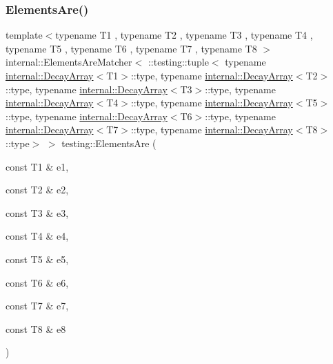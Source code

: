 \subsubsection{\texorpdfstring{ElementsAre()}{ElementsAre()}\hspace{0.1cm}{\footnotesize\ttfamily [9/11]}}
{\footnotesize\ttfamily template$<$typename T1 , typename T2 , typename T3 , typename T4 , typename T5 , typename T6 , typename T7 , typename T8 $>$ \\
internal\+::\+Elements\+Are\+Matcher$<$ \+::testing\+::tuple$<$ typename \mbox{\hyperlink{structtesting_1_1internal_1_1_decay_array}{internal\+::\+Decay\+Array}}$<$T1$>$\+::type, typename \mbox{\hyperlink{structtesting_1_1internal_1_1_decay_array}{internal\+::\+Decay\+Array}}$<$T2$>$\+::type, typename \mbox{\hyperlink{structtesting_1_1internal_1_1_decay_array}{internal\+::\+Decay\+Array}}$<$T3$>$\+::type, typename \mbox{\hyperlink{structtesting_1_1internal_1_1_decay_array}{internal\+::\+Decay\+Array}}$<$T4$>$\+::type, typename \mbox{\hyperlink{structtesting_1_1internal_1_1_decay_array}{internal\+::\+Decay\+Array}}$<$T5$>$\+::type, typename \mbox{\hyperlink{structtesting_1_1internal_1_1_decay_array}{internal\+::\+Decay\+Array}}$<$T6$>$\+::type, typename \mbox{\hyperlink{structtesting_1_1internal_1_1_decay_array}{internal\+::\+Decay\+Array}}$<$T7$>$\+::type, typename \mbox{\hyperlink{structtesting_1_1internal_1_1_decay_array}{internal\+::\+Decay\+Array}}$<$T8$>$\+::type$>$ $>$ testing\+::\+Elements\+Are (\begin{DoxyParamCaption}\item[{const T1 \&}]{e1,  }\item[{const T2 \&}]{e2,  }\item[{const T3 \&}]{e3,  }\item[{const T4 \&}]{e4,  }\item[{const T5 \&}]{e5,  }\item[{const T6 \&}]{e6,  }\item[{const T7 \&}]{e7,  }\item[{const T8 \&}]{e8 }\end{DoxyParamCaption})\hspace{0.3cm}{\ttfamily [inline]}}

\mbox{\label{namespacetesting_aa39ad709c933dbbbe3cbaececa8b4577}} 
